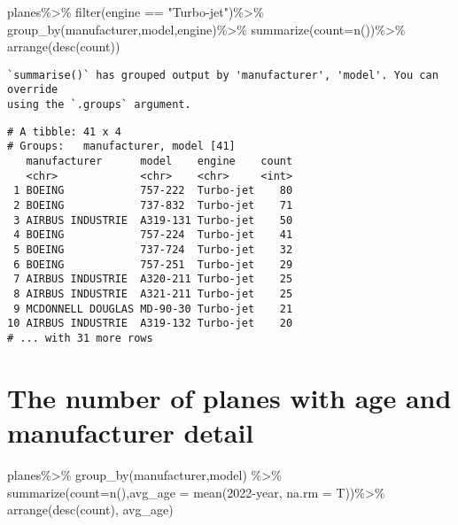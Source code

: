 \documentclass[
  letterpaper,
  DIV=11,
  numbers=noendperiod]{scrreprt}
\newenvironment{Shaded}{\begin{snugshade}}{\end{snugshade}}
\newcommand{\AttributeTok}[1]{\textcolor[rgb]{0.40,0.45,0.13}{#1}}
\newcommand{\DecValTok}[1]{\textcolor[rgb]{0.68,0.00,0.00}{#1}}
\newcommand{\FunctionTok}[1]{\textcolor[rgb]{0.28,0.35,0.67}{#1}}
\newcommand{\NormalTok}[1]{\textcolor[rgb]{0.00,0.23,0.31}{#1}}
\newcommand{\SpecialCharTok}[1]{\textcolor[rgb]{0.37,0.37,0.37}{#1}}
\newcommand{\StringTok}[1]{\textcolor[rgb]{0.13,0.47,0.30}{#1}}
\begin{document}
\begin{Shaded}
\begin{Highlighting}[]
\NormalTok{planes}\SpecialCharTok{\%\textgreater{}\%}
  \FunctionTok{filter}\NormalTok{(engine }\SpecialCharTok{==} \StringTok{"Turbo{-}jet"}\NormalTok{)}\SpecialCharTok{\%\textgreater{}\%}
  \FunctionTok{group\_by}\NormalTok{(manufacturer,model,engine)}\SpecialCharTok{\%\textgreater{}\%}
  \FunctionTok{summarize}\NormalTok{(}\AttributeTok{count=}\FunctionTok{n}\NormalTok{())}\SpecialCharTok{\%\textgreater{}\%}
  \FunctionTok{arrange}\NormalTok{(}\FunctionTok{desc}\NormalTok{(count))}
\end{Highlighting}
\end{Shaded}

\begin{verbatim}
`summarise()` has grouped output by 'manufacturer', 'model'. You can override
using the `.groups` argument.
\end{verbatim}

\begin{verbatim}
# A tibble: 41 x 4
# Groups:   manufacturer, model [41]
   manufacturer      model    engine    count
   <chr>             <chr>    <chr>     <int>
 1 BOEING            757-222  Turbo-jet    80
 2 BOEING            737-832  Turbo-jet    71
 3 AIRBUS INDUSTRIE  A319-131 Turbo-jet    50
 4 BOEING            757-224  Turbo-jet    41
 5 BOEING            737-724  Turbo-jet    32
 6 BOEING            757-251  Turbo-jet    29
 7 AIRBUS INDUSTRIE  A320-211 Turbo-jet    25
 8 AIRBUS INDUSTRIE  A321-211 Turbo-jet    25
 9 MCDONNELL DOUGLAS MD-90-30 Turbo-jet    21
10 AIRBUS INDUSTRIE  A319-132 Turbo-jet    20
# ... with 31 more rows
\end{verbatim}

\hypertarget{the-number-of-planes-with-age-and-manufacturer-detail}{%
\section{The number of planes with age and manufacturer
detail}\label{the-number-of-planes-with-age-and-manufacturer-detail}}

\begin{Shaded}
\begin{Highlighting}[]
\NormalTok{planes}\SpecialCharTok{\%\textgreater{}\%}
  \FunctionTok{group\_by}\NormalTok{(manufacturer,model) }\SpecialCharTok{\%\textgreater{}\%}
  \FunctionTok{summarize}\NormalTok{(}\AttributeTok{count=}\FunctionTok{n}\NormalTok{(),}\AttributeTok{avg\_age =} \FunctionTok{mean}\NormalTok{(}\DecValTok{2022}\SpecialCharTok{{-}}\NormalTok{year, }\AttributeTok{na.rm =}\NormalTok{ T))}\SpecialCharTok{\%\textgreater{}\%}
  \FunctionTok{arrange}\NormalTok{(}\FunctionTok{desc}\NormalTok{(count), avg\_age)}
\end{Highlighting}
\end{Shaded}
\end{document}
